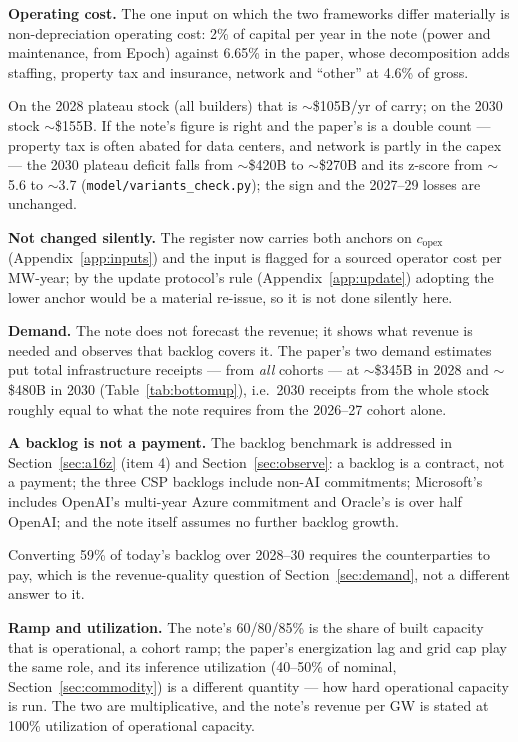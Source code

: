 \documentclass[11pt,letterpaper]{article}
\newcommand{\lead}[1]{{\color{leadwarm}\sffamily\bfseries #1}}
\begin{document}
\textbf{Operating cost.} The one input on which the two frameworks differ materially is non-depreciation operating cost: 2\% of capital per year in the note (power and maintenance, from Epoch) against 6.65\% in the paper, whose decomposition adds staffing, property tax and insurance, network and ``other'' at 4.6\% of gross.

On the 2028 plateau stock (all builders) that is $\sim$\$105B/yr of carry; on the 2030 stock $\sim$\$155B. If the note's figure is right and the paper's is a double count --- property tax is often abated for data centers, and network is partly in the capex --- the 2030 plateau deficit falls from $\sim$\$420B to $\sim$\$270B and its z-score from $\sim$5.6 to $\sim$3.7 (\texttt{model/variants\_check.py}); the sign and the 2027--29 losses are unchanged.

\lead{Not changed silently.} The register now carries both anchors on $c_{\text{opex}}$ (Appendix~\ref{app:inputs}) and the input is flagged for a sourced operator cost per MW-year; by the update protocol's rule (Appendix~\ref{app:update}) adopting the lower anchor would be a material re-issue, so it is not done silently here.

\lead{Demand.} The note does not forecast the revenue; it shows what revenue is needed and observes that backlog covers it. The paper's two demand estimates put total infrastructure receipts --- from \emph{all} cohorts --- at $\sim$\$345B in 2028 and $\sim$\$480B in 2030 (Table~\ref{tab:bottomup}), i.e.\ 2030 receipts from the whole stock roughly equal to what the note requires from the 2026--27 cohort alone.

\lead{A backlog is not a payment.} The backlog benchmark is addressed in Section~\ref{sec:a16z} (item 4) and Section~\ref{sec:observe}: a backlog is a contract, not a payment; the three CSP backlogs include non-AI commitments; Microsoft's includes OpenAI's multi-year Azure commitment and Oracle's is over half OpenAI; and the note itself assumes no further backlog growth.

Converting 59\% of today's backlog over 2028--30 requires the counterparties to pay, which is the revenue-quality question of Section~\ref{sec:demand}, not a different answer to it.

\lead{Ramp and utilization.} The note's 60/80/85\% is the share of built capacity that is operational, a cohort ramp; the paper's energization lag and grid cap play the same role, and its inference utilization (40--50\% of nominal, Section~\ref{sec:commodity}) is a different quantity --- how hard operational capacity is run. The two are multiplicative, and the note's revenue per GW is stated at 100\% utilization of operational capacity.
\end{document}
